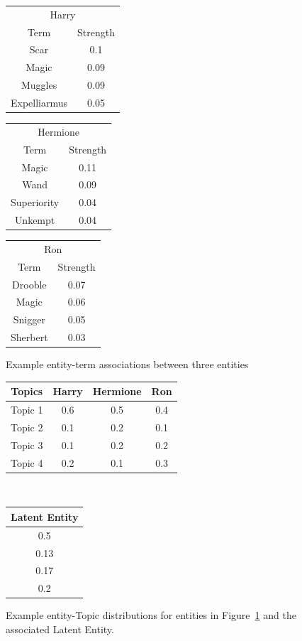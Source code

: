 \documentclass[10pt]{report}
\begin{document}
\begin{figure}[h]
  \centering
  \begin{tabular}{*2c}
      \multicolumn{2}{c}{Harry}\\
      Term&Strength\\
      \hline
      Scar&0.1\\
      Magic&0.09\\
      Muggles&0.09\\
      Expelliarmus&0.05
    \end{tabular}              
    \begin{tabular}{*2c}
      \multicolumn{2}{c}{Hermione}\\
      Term&Strength\\
      \hline
      Magic&0.11\\
      Wand&0.09\\
      Superiority&0.04\\
      Unkempt&0.04      
    \end{tabular}
    \begin{tabular}{*2c}
      \multicolumn{2}{c}{Ron}\\
      Term&Strength\\
      \hline
      Drooble&0.07\\
      Magic&0.06\\
      Snigger&0.05\\
      Sherbert&0.03
    \end{tabular}
  \caption{Example entity-term associations between three entities\label{fig:example_entity_term_associations}}
\end{figure}

\begin{figure}
  \centering
    \begin{tabular}{*4c}
      Topics&Harry&Hermione&Ron\\
      \hline
      Topic 1 & 0.6 & 0.5  & 0.4 \\
      Topic 2 & 0.1 & 0.2  & 0.1 \\
      Topic 3 & 0.1 & 0.2  & 0.2 \\
      Topic 4 & 0.2 & 0.1  & 0.3 \\  
    \end{tabular}
    \vline \,
    \begin{tabular}{*1c}
      \multicolumn{1}{c}{Latent Entity}\\
      \hline
      0.5 \\
      0.13 \\
      0.17\\
      0.2\\
      
      \end{tabular}
  \caption{Example entity-Topic distributions for entities in Figure~\ref{fig:example_entity_term_associations} and the associated Latent Entity. \label{fig:example_entity_topic_distribution}}
\end{figure}
\end{document}
